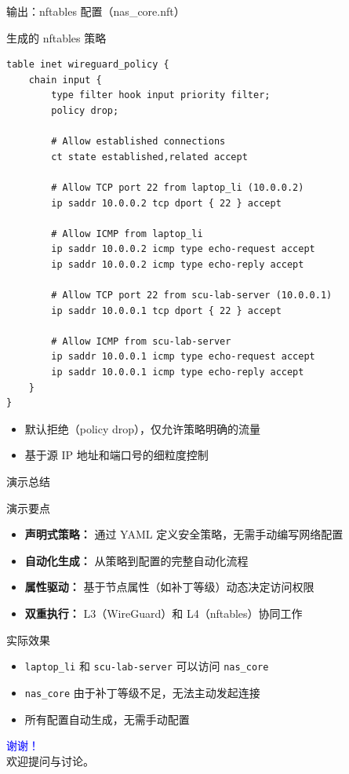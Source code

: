 \documentclass[aspectratio=169, 10pt]{beamer}
\begin{document}
\begin{frame}[fragile]{输出：nftables 配置（nas\_core.nft）}
    \begin{block}{生成的 nftables 策略}
        \lstset{language=bash, basicstyle=\tiny\ttfamily}
        \begin{lstlisting}
table inet wireguard_policy {
    chain input {
        type filter hook input priority filter; 
        policy drop;
        
        # Allow established connections
        ct state established,related accept
        
        # Allow TCP port 22 from laptop_li (10.0.0.2)
        ip saddr 10.0.0.2 tcp dport { 22 } accept
        
        # Allow ICMP from laptop_li
        ip saddr 10.0.0.2 icmp type echo-request accept
        ip saddr 10.0.0.2 icmp type echo-reply accept
        
        # Allow TCP port 22 from scu-lab-server (10.0.0.1)
        ip saddr 10.0.0.1 tcp dport { 22 } accept
        
        # Allow ICMP from scu-lab-server
        ip saddr 10.0.0.1 icmp type echo-request accept
        ip saddr 10.0.0.1 icmp type echo-reply accept
    }
}
        \end{lstlisting}
    \end{block}
    
    \begin{itemize}
        \item 默认拒绝（policy drop），仅允许策略明确的流量
        \item 基于源 IP 地址和端口号的细粒度控制
    \end{itemize}
\end{frame}

\begin{frame}{演示总结}
    \begin{block}{演示要点}
        \begin{itemize}
            \item \textbf{声明式策略：} 通过 YAML 定义安全策略，无需手动编写网络配置
            \item \textbf{自动化生成：} 从策略到配置的完整自动化流程
            \item \textbf{属性驱动：} 基于节点属性（如补丁等级）动态决定访问权限
            \item \textbf{双重执行：} L3（WireGuard）和 L4（nftables）协同工作
        \end{itemize}
    \end{block}
    
    \begin{block}{实际效果}
        \begin{itemize}
            \item \texttt{laptop\_li} 和 \texttt{scu-lab-server} 可以访问 \texttt{nas\_core}
            \item \texttt{nas\_core} 由于补丁等级不足，无法主动发起连接
            \item 所有配置自动生成，无需手动配置
        \end{itemize}
    \end{block}
\end{frame}

\begin{frame}
    \centering
    \Huge \textcolor{blue}{谢谢！} \\
    \vspace{20pt}
    \large 欢迎提问与讨论。
\end{frame}
\end{document}
